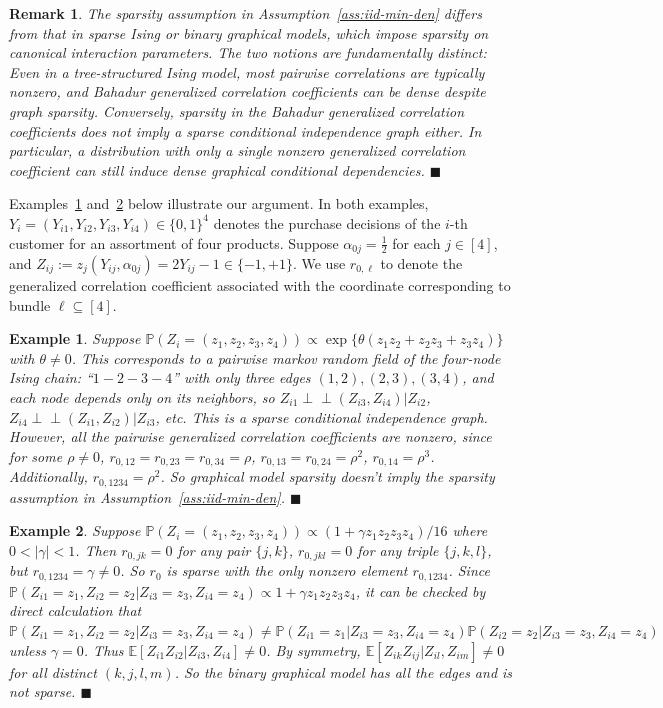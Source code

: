 \documentclass[11pt]{article}
\newtheorem{example}{Example}
\newtheorem{remark}{Remark}
\newcommand{\indep}{\perp\!\!\!\perp}
\newcommand{\proofend}{\hfill$\blacksquare$}
\begin{document}
\begin{remark}\label{rmk:ass1:comparison:ising:graphic}
The sparsity assumption in Assumption~\ref{ass:iid-min-den} differs from that in sparse Ising or binary graphical models, which impose sparsity on canonical interaction parameters. The two notions are fundamentally distinct: Even in a tree-structured Ising model, most pairwise correlations are typically nonzero, and Bahadur generalized correlation coefficients can be dense despite graph sparsity. Conversely, sparsity in the Bahadur generalized correlation coefficients does not imply a sparse conditional independence graph either. In particular, a distribution with only a single nonzero generalized correlation coefficient can still induce dense graphical conditional dependencies.
\proofend
\end{remark}
Examples~\ref{ex1:sparsity} and~\ref{ex2:sparsity} below illustrate our argument. In both examples, $Y_i=(Y_{i1},Y_{i2},Y_{i3},Y_{i4})\in\{0,1\}^4$ denotes the purchase decisions of the $i$-th customer for an assortment of four products. Suppose $\alpha_{0j}=\frac{1}{2}$ for each $j\in[4]$, and $Z_{ij}:=z_{j}(Y_{ij},\alpha_{0j})=2Y_{ij}-1\in\{-1,+1\}$. We use $r_{0,\ell}$ to denote the generalized correlation coefficient associated with the coordinate corresponding to bundle $\ell\subseteq[4]$.
\begin{example}\label{ex1:sparsity}
 Suppose $\mathbb{P}(Z_i=(z_1,z_2,z_3,z_4))\propto\exp\{\theta(z_1z_2+z_2z_3+z_3z_4)\}$ with $\theta\neq0$. This corresponds to a pairwise markov random field of the four-node Ising chain: ``$1-2-3-4$'' with only three edges $(1,2), (2,3), (3,4)$, and each node depends only on its neighbors, so $Z_{i1}\indep(Z_{i3},Z_{i4})|Z_{i2}$, $Z_{i4}\indep (Z_{i1},Z_{i2})|Z_{i3}$, etc. 
This is a sparse conditional independence graph. However, all the pairwise generalized correlation coefficients are nonzero, since for some $\rho\neq0$, $r_{0,12}=r_{0,23}=r_{0,34}=\rho$, $r_{0,13}=r_{0,24}=\rho^2$, $r_{0,14}=\rho^3$. Additionally, $r_{0,1234}=\rho^2$. So graphical model sparsity doesn't imply the sparsity assumption in Assumption~\ref{ass:iid-min-den}.  \proofend
\end{example}
\begin{example}\label{ex2:sparsity}
Suppose $\mathbb{P}(Z_i=(z_1,z_2,z_3,z_4))\propto(1+\gamma z_1z_2z_3z_4)/16$ where $0<|\gamma|<1$. Then $r_{0,jk}=0$ for any pair $\{j,k\}$, $r_{0,jkl}=0$ for any triple $\{j,k,l\}$, but $r_{0,1234}=\gamma\neq0$. So $r_0$ is sparse with the only nonzero element $r_{0,1234}$. Since $\mathbb{P}(Z_{i1}=z_1,Z_{i2}=z_2|Z_{i3}=z_3,Z_{i4}=z_4)\propto 1+\gamma z_1z_2z_3z_4$, it can be checked by direct calculation that $\mathbb{P}(Z_{i1}=z_1,Z_{i2}=z_2|Z_{i3}=z_3,Z_{i4}=z_4)\neq\mathbb{P}(Z_{i1}=z_1|Z_{i3}=z_3,Z_{i4}=z_4)\mathbb{P}(Z_{i2}=z_2|Z_{i3}=z_3,Z_{i4}=z_4)$ unless $\gamma=0$. Thus $\mathbb{E}[Z_{i1}Z_{i2}|Z_{i3},Z_{i4}]\neq0$. By symmetry, $\mathbb{E}[Z_{ik}Z_{ij}|Z_{il},Z_{im}]\neq0$ for all distinct $(k,j,l,m)$. So the binary graphical model has all the edges and is not sparse. \proofend
\end{example}
\end{document}
